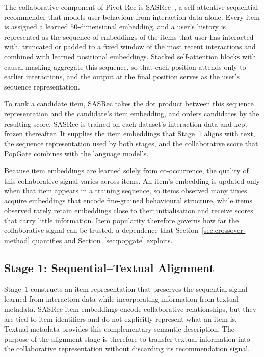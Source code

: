 \documentclass[runningheads]{llncs}
\begin{document}
The collaborative component of Pivot-Rec is SASRec~\cite{sasrec}, a self-attentive
sequential recommender that models user behaviour from interaction data alone.
Every item is assigned a learned $50$-dimensional embedding, and a user's history
is represented as the sequence of embeddings of the items that user has interacted
with, truncated or padded to a fixed window of the most recent interactions and
combined with learned positional embeddings. Stacked self-attention blocks with
causal masking aggregate this sequence, so that each position attends only to
earlier interactions, and the output at the final position serves as the user's
sequence representation.

To rank a candidate item, SASRec takes the dot product between this sequence
representation and the candidate's item embedding, and orders candidates by the
resulting score. SASRec is trained on each dataset's interaction data and kept
frozen thereafter. It supplies the item embeddings that Stage~1 aligns with text,
the sequence representation used by both stages, and the collaborative score that
PopGate combines with the language model's.

Because item embeddings are learned solely from co-occurrence, the quality of this
collaborative signal varies across items. An item's embedding is updated only when
that item appears in a training sequence, so items observed many times acquire
embeddings that encode fine-grained behavioural structure, while items observed
rarely retain embeddings close to their initialisation and receive scores that carry
little information. Item popularity therefore governs how far the collaborative
signal can be trusted, a dependence that Section~\ref{sec:crossover-method}
quantifies and Section~\ref{sec:popgate} exploits.

\subsection{Stage 1: Sequential--Textual Alignment}
\label{sec:stage1}

Stage~1 constructs an item representation that preserves the sequential signal
learned from interaction data while incorporating information from textual
metadata. SASRec item embeddings encode collaborative relationships, but they
are tied to item identifiers and do not explicitly represent what an item is.
Textual metadata provides this complementary semantic description. The purpose
of the alignment stage is therefore to transfer textual information into the
collaborative representation without discarding its recommendation signal.
\end{document}
